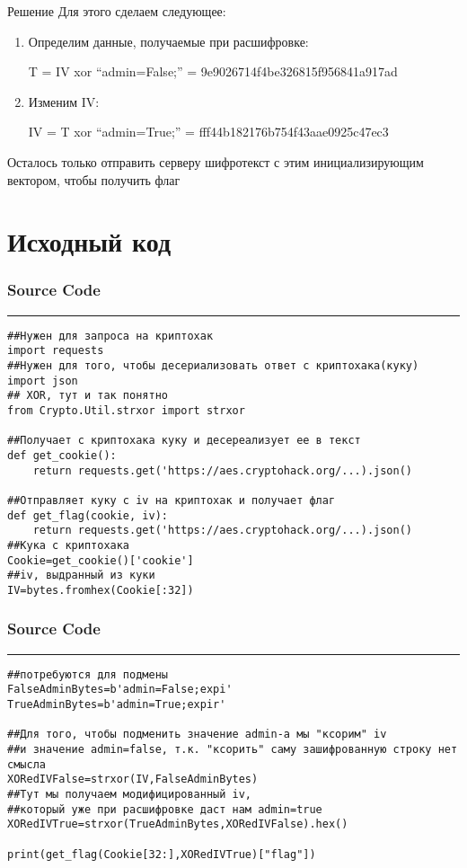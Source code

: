 \documentclass[12pt]{beamer}
\begin{document}
\begin{frame}{Решение}
Для этого сделаем следующее:
  \begin{enumerate}
        \item Определим данные, получаемые при расшифровке:
        \par\footnotesize{T = IV xor “admin=False;” = 9e9026714f4be326815f956841a917ad}
        \item\normalsize{Изменим IV:}
        \par\footnotesize{IV = T xor “admin=True;” = fff44b182176b754f43aae0925c47ec3}
    \end{enumerate}
    Осталось только отправить серверу шифротекст с этим инициализирующим вектором, чтобы получить флаг
\end{frame}
\section{Исходный код}
\begin{frame}[fragile]
    \frametitle{Source Code}
    \rule{\textwidth}{1pt}
    \scriptsize
    \begin{verbatim}
##Нужен для запроса на криптохак
import requests
##Нужен для того, чтобы десериализовать ответ с криптохака(куку)
import json
## XOR, тут и так понятно
from Crypto.Util.strxor import strxor

##Получает с криптохака куку и десереализует ее в текст
def get_cookie():
	return requests.get('https://aes.cryptohack.org/...).json()

##Отправляет куку с iv на криптохак и получает флаг
def get_flag(cookie, iv):
	return requests.get('https://aes.cryptohack.org/...).json()
##Кука с криптохака
Cookie=get_cookie()['cookie']
##iv, выдранный из куки
IV=bytes.fromhex(Cookie[:32])
    \end{verbatim} 
\end{frame}
\begin{frame}[fragile]
    \frametitle{Source Code}
    \rule{\textwidth}{1pt}
    \scriptsize
    \begin{verbatim}
##потребуются для подмены
FalseAdminBytes=b'admin=False;expi'  
TrueAdminBytes=b'admin=True;expir'

##Для того, чтобы подменить значение admin-а мы "ксорим" iv 
##и значение admin=false, т.к. "ксорить" саму зашифрованную строку нет смысла
XORedIVFalse=strxor(IV,FalseAdminBytes)
##Тут мы получаем модифицированный iv,
##который уже при расшифровке даст нам admin=true
XORedIVTrue=strxor(TrueAdminBytes,XORedIVFalse).hex()

print(get_flag(Cookie[32:],XORedIVTrue)["flag"])
    \end{verbatim}
\end{frame}
\end{document}

